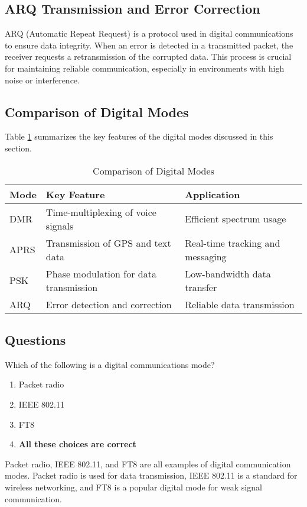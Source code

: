 \subsection*{ARQ Transmission and Error Correction}
ARQ (Automatic Repeat Request) is a protocol used in digital communications to ensure data integrity. When an error is detected in a transmitted packet, the receiver requests a retransmission of the corrupted data. This process is crucial for maintaining reliable communication, especially in environments with high noise or interference.

\subsection*{Comparison of Digital Modes}
Table \ref{tab:digital_modes} summarizes the key features of the digital modes discussed in this section.

\begin{table}[h]
    \centering
    \caption{Comparison of Digital Modes}
    \label{tab:digital_modes}
    \begin{tabular}{|l|l|l|}
        \hline
        \textbf{Mode} & \textbf{Key Feature} & \textbf{Application} \\
        \hline
        DMR & Time-multiplexing of voice signals & Efficient spectrum usage \\
        APRS & Transmission of GPS and text data & Real-time tracking and messaging \\
        PSK & Phase modulation for data transmission & Low-bandwidth data transfer \\
        ARQ & Error detection and correction & Reliable data transmission \\
        \hline
    \end{tabular}
\end{table}

\subsection*{Questions}
\begin{tcolorbox}[colback=gray!10!white,colframe=black!75!black,title={T8D01}]
    Which of the following is a digital communications mode?
    \begin{enumerate}[label=\Alph*,noitemsep]
        \item Packet radio
        \item IEEE 802.11
        \item FT8
        \item \textbf{All these choices are correct}
    \end{enumerate}
\end{tcolorbox}
Packet radio, IEEE 802.11, and FT8 are all examples of digital communication modes. Packet radio is used for data transmission, IEEE 802.11 is a standard for wireless networking, and FT8 is a popular digital mode for weak signal communication.

